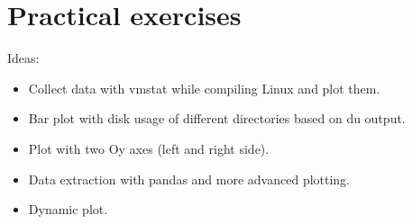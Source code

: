 \newpage

\section{Practical exercises}

Ideas:
\begin{itemize}
    \item Collect data with vmstat while compiling Linux and plot them.

    \item Bar plot with disk usage of different directories based on du output.

    \item Plot with two Oy axes (left and right side).

    \item Data extraction with pandas and more advanced plotting.

    \item Dynamic plot.
\end{itemize}
